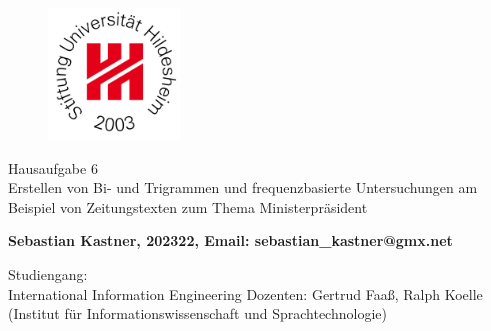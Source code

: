 \begin{titlepage}
\begin{center}
\begin{figure}[htbp]
\begin{center}
\includegraphics[width=3.5cm]{img/UniLogo.png}
\end{center}
\end{figure}

\vspace*{\fill}{
	Stiftung Universität Hildesheim \\ 
	Fachbereich III -- Sprach- und Informationswissenschaften
	\\Institut für Informationswissenschaft und Sprachtechnologie}

\vfill {{\Large Hausaufgabe 6 \\[5mm] Erstellen von Bi- und Trigrammen und
frequenzbasierte Untersuchungen am Beispiel von Zeitungstexten zum Thema
Ministerpräsident}}

{\normalsize \textbf {Sebastian Kastner, 202322, Email:
sebastian\_kastner@gmx.net}}

\vfill{Studiengang:\\ International Information Engineering}
\vfill {Dozenten: Gertrud Faaß, Ralph Koelle\\

(Institut für Informationswissenschaft und Sprachtechnologie)\\}
\end{center}
\end{titlepage}

\thispagestyle{empty}